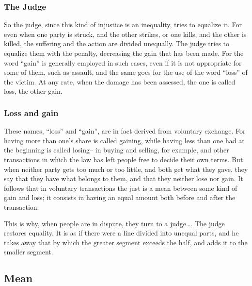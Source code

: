                     \subsubsection{The Judge}

                        So the judge, since this kind of injustice is an inequality, tries to equalize it. For even when one party is struck, and the other strikes, or one kills, and the other is killed, the suffering and the action are divided unequally. The judge tries to equalize them with the penalty, decreasing the gain that has been made. For the word “gain” is generally employed in such cases, even if it is not appropriate for some of them, such as assault, and the same goes for the use of the word “loss” of the victim. At any rate, when the damage has been assessed, the one is called loss, the other gain.

                    \subsubsection{Loss and gain}

                        These names, “loss” and “gain”, are in fact derived from voluntary exchange. For having more than one’s share is called gaining, while having less than one had at the beginning is called losing– in buying and selling, for example, and other transactions in which the law has left people free to decide their own terms. But when neither party gets too much or too little, and both get what they gave, they say that they have what belongs to them, and that they neither lose nor gain. It follows that in voluntary transactions the just is a mean between some kind of gain and loss; it consists in having an equal amount both before and after the transaction.

                        \begin{remark}
                            This is why, when people are in dispute, they turn to a judge…. The judge restores equality. It is as if there were a line divided into unequal parts, and he takes away that by which the greater segment exceeds the half, and adds it to the smaller segment.
                        \end{remark}

            \subsection{Mean}

